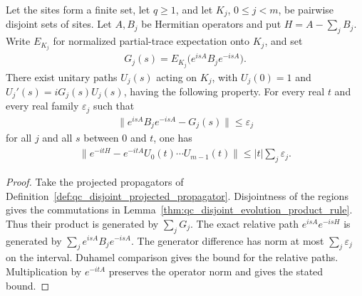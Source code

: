 \begin{lemma}
    \label{thm:qc_disjoint_projected_propagator}
    \leanok
    Let the sites form a finite set, let $q\ge1$, and let $K_j$,
    $0\le j<m$, be pairwise disjoint sets of sites. Let $A,B_j$ be
    Hermitian operators and put $H=A-\sum_jB_j$. Write $E_{K_j}$ for
    normalized partial-trace expectation onto $K_j$, and set
    \begin{align}
        G_j(s)=E_{K_j}\bigl(e^{isA}B_je^{-isA}\bigr).
    \end{align}
    There exist unitary paths $U_j(s)$ acting on $K_j$, with
    $U_j(0)=1$ and $U_j'(s)=iG_j(s)U_j(s)$, having the following
    property. For every real $t$ and every real family $\varepsilon_j$
    such that
    \begin{align}
        \bigl\|e^{isA}B_je^{-isA}-G_j(s)\bigr\|
        \le\varepsilon_j
    \end{align}
    for all $j$ and all $s$ between $0$ and $t$, one has
    \begin{align}
        \bigl\|e^{-itH}-e^{-itA}U_0(t)\cdots U_{m-1}(t)\bigr\|
        \le |t|\sum_j\varepsilon_j.
    \end{align}
\end{lemma}
\begin{proof}
    \leanok
    Take the projected propagators of
    Definition~\ref{def:qc_disjoint_projected_propagator}. Disjointness of the regions gives the
    commutations in Lemma~\ref{thm:qc_disjoint_evolution_product_rule}.
    Thus their product is generated by $\sum_jG_j$.
    The exact relative path $e^{isA}e^{-isH}$ is generated by
    $\sum_je^{isA}B_je^{-isA}$. The generator difference has norm at
    most $\sum_j\varepsilon_j$ on the interval. Duhamel comparison
    gives the bound for the relative paths. Multiplication by
    $e^{-itA}$ preserves the operator norm and gives the stated bound.
\end{proof}
